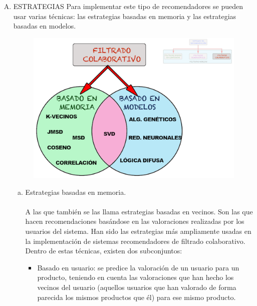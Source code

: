 \documentclass[11pt,a4paper]{article}
\begin{document}
		 	\begin{enumerate}[A.]
		 		\item ESTRATEGIAS
		 		Para implementar este tipo de recomendadores se pueden usar varias técnicas: las estrategias basadas en memoria y las estrategias basadas en modelos.  	
	 	\begin{figure}[H]
		 			\begin{center}
		 				\includegraphics[scale=0.9]{./Imagenes/img02}		
		 			\end{center}
		 		\end{figure}
	 			
	 			\begin{enumerate}[a.]
	 				\item Estrategias basadas en memoria.\\
	 				\\
	 				A las que también se las llama estrategias basadas en vecinos. Son las que hacen recomendaciones basándose en las valoraciones realizadas por los usuarios del sistema. Han sido las estrategias más ampliamente usadas en la implementación de sistemas recomendadores de filtrado colaborativo. Dentro de estas técnicas, existen dos subconjuntos: 
\begin{itemize}
	 					\item Basado en usuario: se predice la valoración de un usuario para un producto, teniendo en cuenta las valoraciones que han hecho los vecinos del usuario (aquellos usuarios que han valorado de forma parecida los mismos productos que él) para ese mismo producto. \\


\end{itemize}
\end{enumerate}
\end{enumerate}
\end{document}
